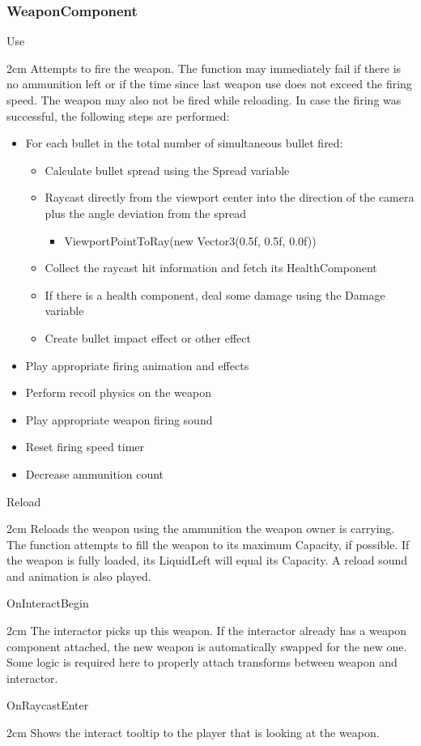 \documentclass[11pt]{article}
\newenvironment{indentall}{\begin{adjustwidth}{2cm}{}}{\end{adjustwidth}}
\begin{document}
\subsubsection{WeaponComponent}
Use
\begin{indentall}
Attempts to fire the weapon. The function may immediately fail if there is no ammunition left or if the time since last weapon use does not exceed the firing speed. The weapon may also not be fired while reloading. In case the firing was successful, the following steps are performed:
\begin{itemize}
\item For each bullet in the total number of simultaneous bullet fired:
\begin{itemize}
\item Calculate bullet spread using the Spread variable
\item Raycast directly from the viewport center into the direction of the camera plus the angle deviation from the spread
\begin{itemize}
\item ViewportPointToRay(new Vector3(0.5f, 0.5f, 0.0f))
\end{itemize}
\item Collect the raycast hit information and fetch its HealthComponent
\item If there is a health component, deal some damage using the Damage variable
\item Create bullet impact effect or other effect
\end{itemize}
\item Play appropriate firing animation and effects
\item Perform recoil physics on the weapon
\item Play appropriate weapon firing sound
\item Reset firing speed timer
\item Decrease ammunition count
\end{itemize}
\end{indentall}
Reload
\begin{indentall}
Reloads the weapon using the ammunition the weapon owner is carrying. The function attempts to fill the weapon to its maximum Capacity, if possible. If the weapon is fully loaded, its LiquidLeft will equal its Capacity. A reload sound and animation is also played.
\end{indentall}
OnInteractBegin
\begin{indentall}
The interactor picks up this weapon. If the interactor already has a weapon component attached, the new weapon is automatically swapped for the new one. Some logic is required here to properly attach transforms between weapon and interactor.
\end{indentall}
OnRaycastEnter
\begin{indentall}
Shows the interact tooltip to the player that is looking at the weapon.
\end{indentall}
\end{document}
